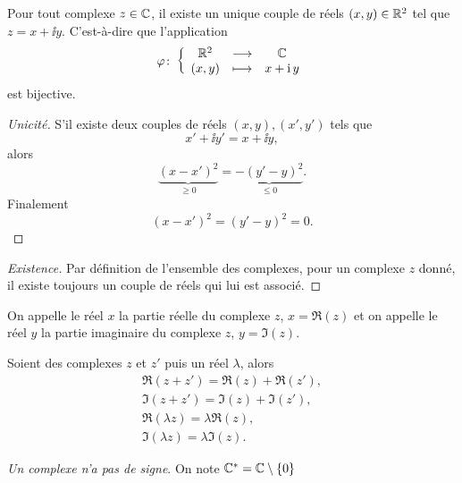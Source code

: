 %
\begin{prop}
  Pour tout complexe $z \in \mathbb{C}$, il existe un unique couple de réels $(x,y) \in \mathbb{R}^2$ tel que $z=x+\ii y$. C'est-à-dire que l'application
  \begin{equation}
    \varphi\colon \left\{\begin{array}{ccc} \mathbb{R}^2 & \longrightarrow &\mathbb{C}\\ (x,y) & \longmapsto & x+\operatorname{i} y \end{array} \right.
  \end{equation}
  est bijective.
\end{prop}
\begin{proof}[Unicité]
  S'il existe deux couples de réels $(x,y),(x',y')$ tels que
  \begin{equation}
    x'+\ii y'=x +\ii y,
  \end{equation}
  alors
  \begin{equation}
    \underbrace{(x-x')^2}_{\geq 0}=\underbrace{-(y'-y)^2}_{\leq 0}.
  \end{equation}
  Finalement
  \begin{equation}
    (x-x')^2=(y'-y)^2=0.
  \end{equation}
\end{proof}
\begin{proof}[Existence]
  Par définition de l'ensemble des complexes, pour un complexe $z$ donné, il existe toujours un couple de réels qui lui est associé.
\end{proof}
%
On appelle le réel $x$ la partie réelle du complexe $z$, $x=\Re(z)$ et on appelle le réel $y$ la partie imaginaire du complexe $z$, $y=\Im(z)$.
%
\begin{prop}
  Soient des complexes $z$ et $z'$ puis un réel $\lambda$, alors
  \begin{gather}
    \Re(z+z')=\Re(z)+\Re(z'), \\
    \Im(z+z')=\Im(z)+\Im(z'),\\
    \Re(\lambda z)=\lambda \Re(z),\\
    \Im(\lambda z)=\lambda \Im(z).
  \end{gather}
\end{prop}
%
\emph{Un complexe n'a pas de signe}. On note $\mathbb{C}^*=\mathbb{C} \setminus \{0\}$
%
